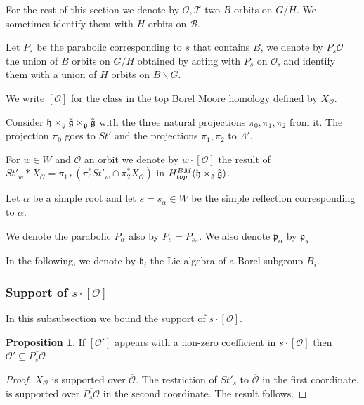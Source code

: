 \documentclass[12pt]{article}
\newcommand{\B}{\mathcal{B}}
\newcommand{\s}{\mathcal{O}}
\theoremstyle{plain}
\theoremstyle{definition}
\newtheorem{prop}[theorem]{Proposition}
\begin{document}
For the rest of this section we denote by $\s,\mathcal{T}$ two $B$ orbits on $G/H$. We sometimes identify them with $H$ orbits on $\B$. 

Let $P_s$ be the parabolic corresponding to $s$ that contains $B$, we denote by $P_s\s$ the union of $B$ orbits on $G/H$ obtained by acting with $P_s$ on $\s$, and identify them with a union of $H$ orbits on $B\backslash G$.

We write $[\mathcal{O}]$ for the class in the top Borel Moore homology defined by $X_{\mathcal{O}}$.

Consider $\mathfrak{h}\times_{\mathfrak{g}}\Tilde{\mathfrak{g}}\times_{\mathfrak{g}}\Tilde{\mathfrak{g}}$ with the three natural projections $\pi_0,\pi_1,\pi_2$ from it. The projection $\pi_0$ goes to $St'$ and the projections $\pi_1,\pi_2$ to $\Lambda'$.

For $w\in W$ and $\s$ an orbit we denote by $w\cdot [\s]$ the result of $St'_w*X_\s=\pi_{1*}(\pi_0^*St'_w\cap \pi_2^*X_\s)$ in $H^{BM}_{top}(\mathfrak{h}\times_{\mathfrak{g}}\Tilde{\mathfrak{g}})$.


Let $\alpha$ be a simple root and let $s=s_\alpha\in W$ be the simple reflection corresponding to $\alpha$.

We denote the parabolic $P_\alpha$ also by $P_s=P_{s_\alpha}$. We also denote $\mathfrak{p_\alpha}$ by $\mathfrak{p_s}$

In the following, we denote by $\mathfrak{b}_i$ the Lie algebra of a Borel subgroup $B_i$.


\subsubsection{Support of $s \cdot [\mathcal{O}]$}

In this subsubsection we bound the support of $s\cdot [\mathcal{O}]$.

\begin{prop}\label{prop: contained in closure}
    If $[\mathcal{O}']$ appears with a non-zero coefficient in $s \cdot [\mathcal{O}]$ then $\mathcal{O}'\subseteq \overline{P_{s} \mathcal{O}}$ 
\end{prop}
\begin{proof}
    $X_{\mathcal{O}}$ is supported over $\overline{\s}$. The restriction of $St'_s$ to $\overline{\mathcal{O}}$ in the first coordinate, is supported over $\overline{P_{s}\mathcal{O}}$ in the second coordinate. The result follows.
\end{proof}
\end{document}
